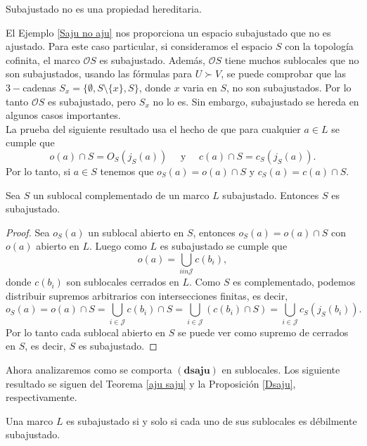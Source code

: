 \begin{cor}\label{saju no saju}
    Subajustado no es una propiedad hereditaria. 
\end{cor}

El Ejemplo \ref{Saju no aju} nos proporciona un espacio subajustado que no es ajustado. Para este caso particular, si consideramos el espacio $S$ con la topología cofinita, el marco $\mathcal{O}S$ es subajustado. Además, $\mathcal{O}S$ tiene muchos sublocales que no son subajustados, usando las fórmulas para $U\succ V$, se puede comprobar que las $3-$cadenas $S_x=\{\emptyset, S\setminus \{x\}, S\}$, donde $x$ varia en $S$, no son subajustados. Por lo tanto $\mathcal{O}S$ es subajustado, pero $S_x$ no lo es. Sin embargo, subajustado se hereda en algunos casos importantes.\\

La prueba del siguiente resultado usa el hecho de que para cualquier $a\in L$ se cumple que 
\[
o(a)\cap S=O_S(j_S(a))\quad\mbox{ y }\quad c(a)\cap S=c_S(j_S(a)).
\]
Por lo tanto, si $a\in S$ tenemos que $o_S(a)=o(a)\cap S$ y $c_S(a)=c(a)\cap S$.

\begin{thm}\label{saju complementado}
    Sea $S$ un sublocal complementado de un marco $L$ subajustado. Entonces $S$ es subajustado.
\end{thm}

\begin{proof}
    Sea $o_S(a)$ un sublocal abierto en $S$, entonces $o_S(a)=o(a)\cap S$ con $o(a)$ abierto en $L$. Luego como $L$ es subajustado se cumple que 
    \[
    o(a)=\bigcup_{iin \mathcal{J}} c(b_i),
    \]
    donde $c(b_i)$ son sublocales cerrados en $L$. Como $S$ es complementado, podemos distribuir supremos arbitrarios con intersecciones finitas, es decir, 
    \[
    o_S(a)=o(a)\cap S=\bigcup_{i\in \mathcal{J}}c(b_i)\cap S=\bigcup_{i\in \mathcal{J}}(c(b_i)\cap S)=\bigcup_{i\in \mathcal{J}}c_S(j_S(b_i)).
    \]
    Por lo tanto cada sublocal abierto en $S$ se puede ver como supremo de cerrados en $S$, es decir, $S$ es subajustado. 
\end{proof}

Ahora analizaremos como se comporta $(\mathbf{dsaju})$ en sublocales. Los siguiente resultado se siguen del Teorema \ref{aju saju} y la Proposición \ref{Dsaju}, respectivamente.

\begin{cor}\label{Aju dsaju}
    Una marco $L$ es subajustado si y solo si cada uno de sus sublocales es débilmente subajustado.
\end{cor}

